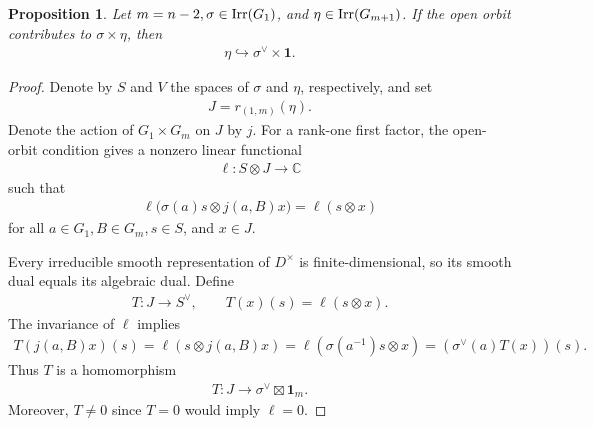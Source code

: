 \documentclass[11pt,leqno]{amsart}
\numberwithin{equation}{section}
\theoremstyle{plain}
\newtheorem{proposition}[theorem]{Proposition}
\theoremstyle{definition}
\theoremstyle{remark}
\newcommand{\one}{\mathbf{1}}
\begin{document}
	
	\begin{proposition}\label{lem:open}
		Let $m=n-2, \sigma \in {\rm Irr}(G_1)$, and $\eta\in {\rm Irr}(G_{m+1})$.
		If the open orbit contributes to \(\sigma\times\eta\), then
		\begin{align*}
			\eta\hookrightarrow\sigma^\vee\times\one.
		\end{align*}
	\end{proposition}	
	\begin{proof}
		Denote by $S$ and $V$ the spaces of $\sigma$ and $\eta$, respectively, and set
		\begin{align*}
			J=r_{(1,m)}(\eta).
		\end{align*}
		Denote the action of $G_1\times G_m$ on $J$ by $j$.
		For a rank-one first factor, the open-orbit condition gives a nonzero linear functional
		\begin{align*}
			\ell:S\otimes J\longrightarrow\mathbb C
		\end{align*}
		such that
		\begin{align*}
			\ell\bigl(\sigma(a)s\otimes j(a,B)x\bigr)=\ell(s\otimes x)
		\end{align*}
		for all $a\in G_1, B\in G_m, s\in S$, and $x\in J$.
		
		Every irreducible smooth representation of \(D^\times\) is finite-dimensional, so its smooth dual equals its algebraic dual.
		Define
		\begin{align*}
			T:J\longrightarrow S^\vee, \qquad T(x)(s)=\ell(s\otimes x).
		\end{align*}
		The invariance of \(\ell\) implies
		\begin{align*}
			T(j(a,B)x)(s)=\ell(s\otimes j(a,B)x)=\ell(\sigma(a^{-1})s\otimes x)=(\sigma^\vee(a)T(x))(s).
		\end{align*}
		Thus $T$ is a homomorphism
		\begin{align*}
			T:J\longrightarrow\sigma^\vee\boxtimes\mathbf1_m.
		\end{align*}
		Moreover, $T\neq0$ since $T=0$ would imply $\ell=0$.
		

\end{proof}
\end{document}
